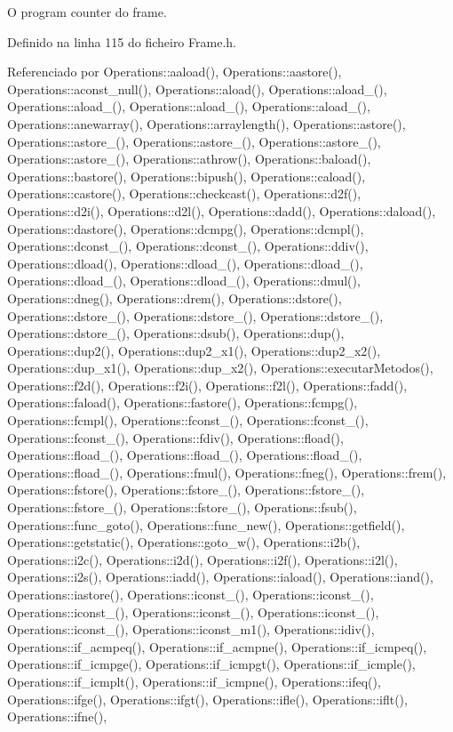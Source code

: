 O program counter do frame. 

Definido na linha 115 do ficheiro Frame.\+h.



Referenciado por Operations\+::aaload(), Operations\+::aastore(), Operations\+::aconst\+\_\+null(), Operations\+::aload(), Operations\+::aload\+\_(), Operations\+::aload\+\_(), Operations\+::aload\+\_(), Operations\+::aload\+\_(), Operations\+::anewarray(), Operations\+::arraylength(), Operations\+::astore(), Operations\+::astore\+\_(), Operations\+::astore\+\_(), Operations\+::astore\+\_(), Operations\+::astore\+\_(), Operations\+::athrow(), Operations\+::baload(), Operations\+::bastore(), Operations\+::bipush(), Operations\+::caload(), Operations\+::castore(), Operations\+::checkcast(), Operations\+::d2f(), Operations\+::d2i(), Operations\+::d2l(), Operations\+::dadd(), Operations\+::daload(), Operations\+::dastore(), Operations\+::dcmpg(), Operations\+::dcmpl(), Operations\+::dconst\+\_(), Operations\+::dconst\+\_(), Operations\+::ddiv(), Operations\+::dload(), Operations\+::dload\+\_(), Operations\+::dload\+\_(), Operations\+::dload\+\_(), Operations\+::dload\+\_(), Operations\+::dmul(), Operations\+::dneg(), Operations\+::drem(), Operations\+::dstore(), Operations\+::dstore\+\_(), Operations\+::dstore\+\_(), Operations\+::dstore\+\_(), Operations\+::dstore\+\_(), Operations\+::dsub(), Operations\+::dup(), Operations\+::dup2(), Operations\+::dup2\+\_\+x1(), Operations\+::dup2\+\_\+x2(), Operations\+::dup\+\_\+x1(), Operations\+::dup\+\_\+x2(), Operations\+::executar\+Metodos(), Operations\+::f2d(), Operations\+::f2i(), Operations\+::f2l(), Operations\+::fadd(), Operations\+::faload(), Operations\+::fastore(), Operations\+::fcmpg(), Operations\+::fcmpl(), Operations\+::fconst\+\_(), Operations\+::fconst\+\_(), Operations\+::fconst\+\_(), Operations\+::fdiv(), Operations\+::fload(), Operations\+::fload\+\_(), Operations\+::fload\+\_(), Operations\+::fload\+\_(), Operations\+::fload\+\_(), Operations\+::fmul(), Operations\+::fneg(), Operations\+::frem(), Operations\+::fstore(), Operations\+::fstore\+\_(), Operations\+::fstore\+\_(), Operations\+::fstore\+\_(), Operations\+::fstore\+\_(), Operations\+::fsub(), Operations\+::func\+\_\+goto(), Operations\+::func\+\_\+new(), Operations\+::getfield(), Operations\+::getstatic(), Operations\+::goto\+\_\+w(), Operations\+::i2b(), Operations\+::i2c(), Operations\+::i2d(), Operations\+::i2f(), Operations\+::i2l(), Operations\+::i2s(), Operations\+::iadd(), Operations\+::iaload(), Operations\+::iand(), Operations\+::iastore(), Operations\+::iconst\+\_(), Operations\+::iconst\+\_(), Operations\+::iconst\+\_(), Operations\+::iconst\+\_(), Operations\+::iconst\+\_(), Operations\+::iconst\+\_(), Operations\+::iconst\+\_\+m1(), Operations\+::idiv(), Operations\+::if\+\_\+acmpeq(), Operations\+::if\+\_\+acmpne(), Operations\+::if\+\_\+icmpeq(), Operations\+::if\+\_\+icmpge(), Operations\+::if\+\_\+icmpgt(), Operations\+::if\+\_\+icmple(), Operations\+::if\+\_\+icmplt(), Operations\+::if\+\_\+icmpne(), Operations\+::ifeq(), Operations\+::ifge(), Operations\+::ifgt(), Operations\+::ifle(), Operations\+::iflt(), Operations\+::ifne(), 